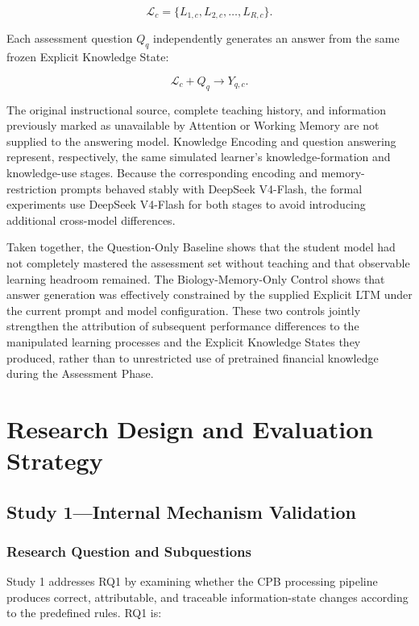 \[
\mathcal{L}_c=
\{L_{1,c},L_{2,c},\ldots,L_{R,c}\}.
\]

Each assessment question $Q_q$ independently generates an answer from the same frozen Explicit Knowledge State:

\[
\mathcal{L}_c + Q_q
\rightarrow
Y_{q,c}.
\]

The original instructional source, complete teaching history, and information previously marked as unavailable by Attention or Working Memory are not supplied to the answering model. Knowledge Encoding and question answering represent, respectively, the same simulated learner's knowledge-formation and knowledge-use stages. Because the corresponding encoding and memory-restriction prompts behaved stably with DeepSeek V4-Flash, the formal experiments use DeepSeek V4-Flash for both stages to avoid introducing additional cross-model differences.

Taken together, the Question-Only Baseline shows that the student model had not completely mastered the assessment set without teaching and that observable learning headroom remained. The Biology-Memory-Only Control shows that answer generation was effectively constrained by the supplied Explicit LTM under the current prompt and model configuration. These two controls jointly strengthen the attribution of subsequent performance differences to the manipulated learning processes and the Explicit Knowledge States they produced, rather than to unrestricted use of pretrained financial knowledge during the Assessment Phase.


\section{Research Design and Evaluation Strategy}
\label{sec:research-design-evaluation}

\subsection{Study 1---Internal Mechanism Validation}
\label{subsec:study1-design}

\subsubsection{Research Question and Subquestions}

Study 1 addresses RQ1 by examining whether the CPB processing pipeline produces correct, attributable, and traceable information-state changes according to the predefined rules. RQ1 is:

